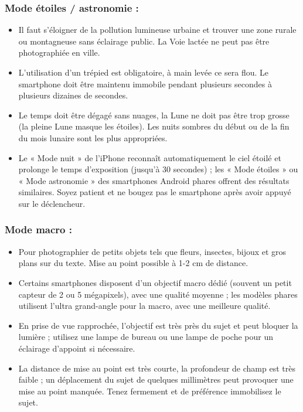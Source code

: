 \subsubsection*{Mode étoiles / astronomie :}

\begin{itemize}
  \item Il faut s'éloigner de la pollution lumineuse urbaine et trouver une zone rurale ou montagneuse sans éclairage public. La Voie lactée ne peut pas être photographiée en ville.
  \item L'utilisation d'un trépied est obligatoire, à main levée ce sera flou. Le smartphone doit être maintenu immobile pendant plusieurs secondes à plusieurs dizaines de secondes.
  \item Le temps doit être dégagé sans nuages, la Lune ne doit pas être trop grosse (la pleine Lune masque les étoiles). Les nuits sombres du début ou de la fin du mois lunaire sont les plus appropriées.
  \item Le « Mode nuit » de l'iPhone reconnaît automatiquement le ciel étoilé et prolonge le temps d'exposition (jusqu'à 30 secondes) ; les « Mode étoiles » ou « Mode astronomie » des smartphones Android phares offrent des résultats similaires. Soyez patient et ne bougez pas le smartphone après avoir appuyé sur le déclencheur.
\end{itemize}

\subsubsection*{Mode macro :}

\begin{itemize}
  \item Pour photographier de petits objets tels que fleurs, insectes, bijoux et gros plans sur du texte. Mise au point possible à 1-2 cm de distance.
  \item Certains smartphones disposent d'un objectif macro dédié (souvent un petit capteur de 2 ou 5 mégapixels), avec une qualité moyenne ; les modèles phares utilisent l'ultra grand-angle pour la macro, avec une meilleure qualité.
  \item En prise de vue rapprochée, l'objectif est très près du sujet et peut bloquer la lumière ; utilisez une lampe de bureau ou une lampe de poche pour un éclairage d'appoint si nécessaire.
  \item La distance de mise au point est très courte, la profondeur de champ est très faible ; un déplacement du sujet de quelques millimètres peut provoquer une mise au point manquée. Tenez fermement et de préférence immobilisez le sujet.
\end{itemize}

